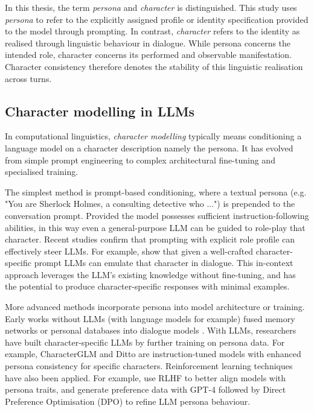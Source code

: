 \documentclass{article}
\begin{document}
In this thesis, the term \emph{persona} and \emph{character} is distinguished. This study uses \emph{persona} to refer to the explicitly assigned profile or identity specification provided to the model through prompting. In contrast, \emph{character} refers to the identity as realised through linguistic behaviour in dialogue. While persona concerns the intended role, character concerns its performed and observable manifestation. Character consistency therefore denotes the stability of this linguistic realisation across turns.

\subsection{Character modelling in LLMs} \label{sec:background_char_modelling}

In computational linguistics, \emph{character modelling} typically means conditioning a language model on a character description namely the persona. It has evolved from simple prompt engineering to complex architectural fine-tuning and specialised training. 

The simplest method is prompt-based conditioning, where a textual persona (e.g. "You are Sherlock Holmes, a consulting detective who ...") is prepended to the conversation prompt. Provided the model possesses sufficient instruction-following abilities, in this way even a general-purpose LLM can be guided to role-play that character. Recent studies confirm that prompting with explicit role profile can effectively steer LLMs. For example, \citet{chen2023autoagents, shao2023characterllm, tu2024charactereval, wang2024rolellm} show that given a well-crafted character-specific prompt LLMs can emulate that character in dialogue. This in-context approach leverages the LLM's existing knowledge without fine-tuning, and has the potential to produce character-specific responses with minimal examples.

More advanced methods incorporate persona into model architecture or training. Early works without LLMs (with language models for example) fused memory networks or personal databases into dialogue models \citep{zhang2018personalizing}. With LLMs, researchers have built character-specific LLMs by further training on persona data. For example, CharacterGLM \citep{zhou2023characterglm} and Ditto \citep{li2021ditto, lu2024large} are instruction-tuned models with enhanced persona consistency for specific characters. Reinforcement learning techniques have also been applied. For example, \citet{shea2023building} use RLHF to better align models with persona traits, and \citet{chen2025compress} generate preference data with GPT-4 followed by Direct Preference Optimisation (DPO) to refine LLM persona behaviour. 
\end{document}
